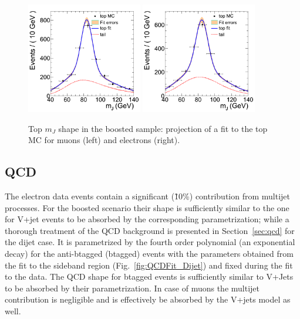 \begin{figure}
\begin{center}
\includegraphics[width=0.45\textwidth]{figs/wpj/DibosonBoostedlnuJ_top_muon_2jets.png}
\includegraphics[width=0.45\textwidth]{figs/wpj/DibosonBoostedlnuJ_top_electron_2jets.png}
\end{center}
\caption{Top $m_{J}$ shape in the boosted sample: projection of a fit to the top MC for muons (left) and electrons (right).}
\label{fig:topFit_Boosted}
\end{figure}

\subsection{QCD}
The electron data events contain a significant (\~10\%) contribution from multijet processes. For the boosted scenario their shape is sufficiently similar to the one for V+jet events to be absorbed by the corresponding parametrization; while a thorough treatment of the QCD background is presented in Section~\ref{sec:qcd} for the dijet case. It is parametrized by the fourth order polynomial (an exponential decay) for the anti-btagged (btagged) events with the parameters obtained from the fit to the sideband region (Fig.~\ref{fig:QCDFit_Dijet}) and fixed during the fit to the data. The QCD shape for btagged events is sufficiently similar to V+Jets to be absorbed by their parametrization. In case of muons the multijet contribution is negligible and is effectively be absorbed by the V+jets model as well.

